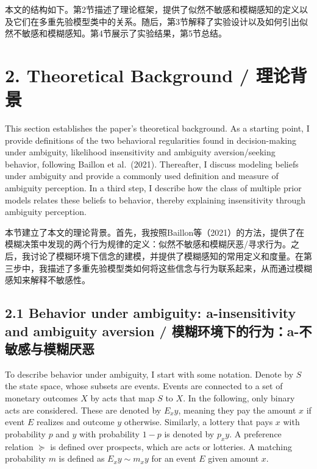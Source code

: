 \documentclass[12pt,a4paper]{article}
\newenvironment{original}
  {\par\medskip\noindent\color{black}\ignorespaces}
  {\par\medskip}
\newenvironment{translation}
  {\par\noindent\color{transblue}\ignorespaces}
  {\par\medskip\medskip}
\begin{document}
\begin{translation}
本文的结构如下。第2节描述了理论框架，提供了似然不敏感和模糊感知的定义以及它们在多重先验模型类中的关系。随后，第3节解释了实验设计以及如何引出似然不敏感和模糊感知。第4节展示了实验结果，第5节总结。
\end{translation}

\newpage
\section{2. Theoretical Background / 理论背景}

\begin{original}
This section establishes the paper's theoretical background. As a starting point, I provide definitions of the two behavioral regularities found in decision-making under ambiguity, likelihood insensitivity and ambiguity aversion/seeking behavior, following Baillon et al.\ (2021). Thereafter, I discuss modeling beliefs under ambiguity and provide a commonly used definition and measure of ambiguity perception. In a third step, I describe how the class of multiple prior models relates these beliefs to behavior, thereby explaining insensitivity through ambiguity perception.
\end{original}

\begin{translation}
本节建立了本文的理论背景。首先，我按照Baillon等（2021）的方法，提供了在模糊决策中发现的两个行为规律的定义：似然不敏感和模糊厌恶/寻求行为。之后，我讨论了模糊环境下信念的建模，并提供了模糊感知的常用定义和度量。在第三步中，我描述了多重先验模型类如何将这些信念与行为联系起来，从而通过模糊感知来解释不敏感性。
\end{translation}

\subsection{2.1 Behavior under ambiguity: a-insensitivity and ambiguity aversion / 模糊环境下的行为：a-不敏感与模糊厌恶}

\begin{original}
To describe behavior under ambiguity, I start with some notation. Denote by $S$ the state space, whose subsets are events. Events are connected to a set of monetary outcomes $X$ by acts that map $S$ to $X$. In the following, only binary acts are considered. These are denoted by $E_x y$, meaning they pay the amount $x$ if event $E$ realizes and outcome $y$ otherwise. Similarly, a lottery that pays $x$ with probability $p$ and $y$ with probability $1-p$ is denoted by $p_x y$. A preference relation $\succcurlyeq$ is defined over prospects, which are acts or lotteries. A matching probability $m$ is defined as $E_x y \sim m_x y$ for an event $E$ given amount $x$.
\end{original}
\end{document}
